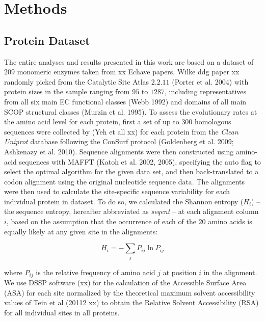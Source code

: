 \documentclass[11pt]{article}
\begin{document}
\section{Methods}
\label{sec:methods}

    \subsection*{Protein Dataset}

        The entire analyses and results presented in this work are based on a dataset of $209$ monomeric enzymes taken from xx Echave papers, Wilke ddg paper xx randomly picked from the Catalytic Site Atlas $2.2.11$ (Porter et al. 2004) with protein sizes in the sample ranging from $95$ to $1287$, including representatives from all six main EC functional classes (Webb 1992) and domains of all main SCOP structural classes (Murzin et al. 1995). To assess the evolutionary rates at the amino acid level for each protein, first a set of up to $300$ homologous sequences were collected by (Yeh et all xx) for each protein from the {\it Clean Uniprot} database following the ConSurf protocol (Goldenberg et al. 2009; Ashkenazy et al. 2010). Sequence alignments were then constructed using amino-acid sequences with MAFFT (Katoh et al. 2002, 2005), specifying the auto flag to select the optimal algorithm for the given data set, and then back-translated to a codon alignment using the original nucleotide sequence data. The alignments were then used to calculate the site-specific sequence variability for each individual protein in dataset. To do so, we calculated the Shannon entropy ($H_i$) -- the sequence entropy, hereafter abbreviated as {\it seqent} -- at each alignment column $i$, based on the assumption that the occurrence of each of the $20$ amino acids is equally likely at any given site in the alignments:

        \begin{equation}
            \label{eqn:shannon}
            H_i = -\sum_j P_{ij}\ln P_{ij}
        \end{equation}

        where $P_{ij}$ is the relative frequency of amino acid $j$ at position $i$ in the alignment. We use DSSP software (xx) for the calculation of the Accessible Surface Area (ASA) for each site normalized by the theoretical maximum solvent accessibility values of Tein et al (20112 xx) to obtain the Relative Solvent Accessibility (RSA) for all individual sites in all proteins. \\
\end{document}
